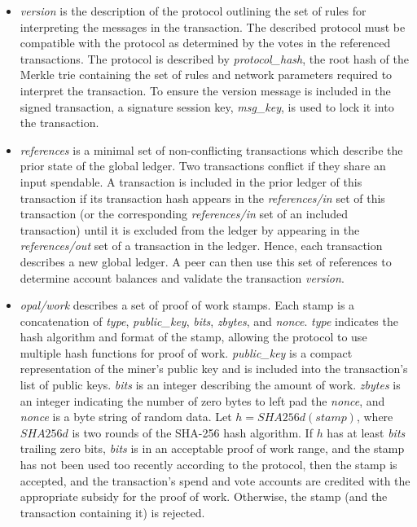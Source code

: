 \documentclass[10pt,twocolumn]{article}
\begin{document}
\begin{itemize}
\item {\em version} is the description of the protocol outlining the set of rules for interpreting the messages in the transaction.  The described protocol must be compatible with the protocol as determined by the votes in the referenced transactions.  The protocol is described by {\em protocol\_hash}, the root hash of the Merkle trie containing the set of rules and network parameters required to interpret the transaction.  To ensure the version message is included in the signed transaction, a signature session key, {\em msg\_key}, is used to lock it into the transaction.

\item {\em references} is a minimal set of non-conflicting transactions which describe the prior state of the global ledger.  Two transactions conflict if they share an input spendable.  A transaction is included in the prior ledger of this transaction if its transaction hash appears in the {\em references/in} set of this transaction (or the corresponding {\em references/in} set of an included transaction) until it is excluded from the ledger by appearing in the {\em references/out} set of a transaction in the ledger.  Hence, each transaction describes a new global ledger.  A peer can then use this set of references to determine account balances and validate the transaction {\em version}.

\item {\em opal/work} describes a set of proof of work stamps.  Each stamp is a concatenation of {\em type}, {\em public\_key}, {\em bits}, {\em zbytes}, and {\em nonce}.  {\em type} indicates the hash algorithm and format of the stamp, allowing the protocol to use multiple hash functions for proof of work. {\em public\_key} is a compact representation of the miner's public key and is included into the transaction's list of public keys.  {\em bits} is an integer describing the amount of work.  {\em zbytes} is an integer indicating the number of zero bytes to left pad the {\em nonce}, and {\em nonce} is a byte string of random data.  Let $h = SHA256d(stamp)$, where $SHA256d$ is two rounds of the SHA-256 hash algorithm.  If $h$ has at least {\em bits} trailing zero bits, {\em bits} is in an acceptable proof of work range, and the stamp has not been used too recently according to the protocol, then the stamp is accepted, and the transaction's spend and vote accounts are credited with the appropriate subsidy for the proof of work. Otherwise, the stamp (and the transaction containing it) is rejected.


\end{itemize}
\end{document}
